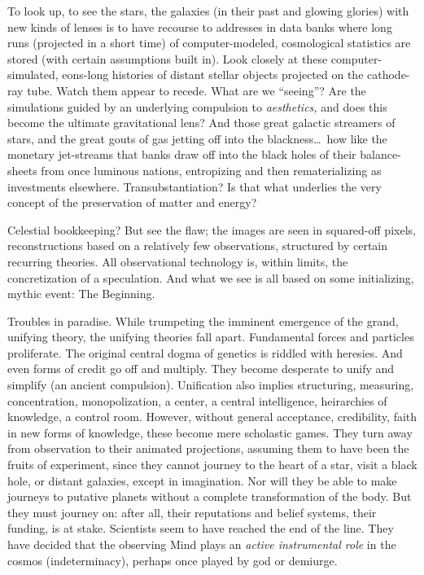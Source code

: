 \documentclass[11pt,twoside,draft]{memoir}
\begin{document}
To look up, to see the stars, the galaxies (in their past and glowing glories) with new kinds of lenses is to have recourse to addresses in data banks where long runs (projected in a short time) of computer-modeled, cosmological statistics are stored (with certain assumptions built in). Look closely at these computer-simulated, eons-long histories of distant stellar objects projected on the cathode-ray tube. Watch them appear to recede. What are we \enquote{seeing}? Are the simulations guided by an underlying compulsion to \emph{aesthetics,} and does this become the ultimate gravitational lens? And those great galactic streamers of stars, and the great gouts of gas jetting off into the blackness\ldots\ how like the monetary jet-streams that banks draw off into the black holes of their balance-sheets from once luminous nations, entropizing and then rematerializing as investments elsewhere. Transubstantiation? Is that what underlies the very concept of the preservation of matter and energy?

Celestial bookkeeping? But see the flaw; the images are seen in squared-off pixels, reconstructions based on a relatively few observations, structured by certain recurring theories. All observational technology is, within limits, the concretization of a speculation. And what we see is all based on some initializing, mythic event: The Beginning.

Troubles in paradise. While trumpeting the imminent emergence of the grand, unifying theory, the unifying theories fall apart. Fundamental forces and particles proliferate. The original central dogma of genetics is riddled with heresies. And even forms of credit go off and multiply. They become desperate to unify and simplify (an ancient compulsion). Unification also implies structuring, measuring, concentration, monopolization, a center, a central intelligence, heirarchies of knowledge, a control room. However, without general acceptance, credibility, faith in new forms of knowledge, these become mere scholastic games. They turn away from observation to their animated projections, assuming them to have been the fruits of experiment, since they cannot journey to the heart of a star, visit a black hole, or distant galaxies, except in imagination. Nor will they be able to make journeys to putative planets without a complete transformation of the body. But they must journey on: after all, their reputations and belief systems, their funding, is at stake. Scientists seem to have reached the end of the line. They have decided that the observing Mind plays an \emph{active instrumental role} in the cosmos (indeterminacy), perhaps once played by god or demiurge.
\end{document}
